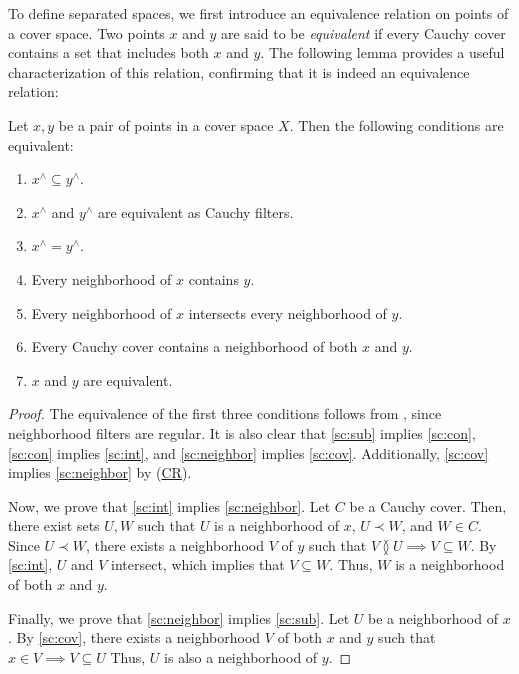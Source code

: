\documentclass[pdflatex,sn-mathphys-num]{sn-jnl}
\newcommand{\axref}[1]{(\hyperref[ax:#1]{#1})}
\theoremstyle{definition}
\theoremstyle{remark}
\numberwithin{figure}{section}
\newcommand{\overlap}[2]{#1 \between #2}
\newcommand{\rb}{\prec}
\begin{document}
To define separated spaces, we first introduce an equivalence relation on points of a cover space.
Two points $x$ and $y$ are said to be \emph{equivalent} if every Cauchy cover contains a set that includes both $x$ and $y$.
The following lemma provides a useful characterization of this relation, confirming that it is indeed an equivalence relation:

\begin{lem}
Let $x,y$ be a pair of points in a cover space $X$.
Then the following conditions are equivalent:
\begin{enumerate}
\item \label{sc:sub} $x^\wedge \subseteq y^\wedge$.
\item $x^\wedge$ and $y^\wedge$ are equivalent as Cauchy filters.
\item $x^\wedge = y^\wedge$.
\item \label{sc:con} Every neighborhood of $x$ contains $y$.
\item \label{sc:int} Every neighborhood of $x$ intersects every neighborhood of $y$.
\item \label{sc:neighbor} Every Cauchy cover contains a neighborhood of both $x$ and $y$.
\item \label{sc:cov} $x$ and $y$ are equivalent.
\end{enumerate}
\end{lem}
\begin{proof}
The equivalence of the first three conditions follows from , since neighborhood filters are regular.
It is also clear that \eqref{sc:sub} implies \eqref{sc:con}, \eqref{sc:con} implies \eqref{sc:int}, and \eqref{sc:neighbor} implies \eqref{sc:cov}.
Additionally, \eqref{sc:cov} implies \eqref{sc:neighbor} by \axref{CR}.

Now, we prove that \eqref{sc:int} implies \eqref{sc:neighbor}.
Let $C$ be a Cauchy cover.
Then, there exist sets $U,W$ such that $U$ is a neighborhood of $x$, $U \rb W$, and $W \in C$.
Since $U \rb W$, there exists a neighborhood $V$ of $y$ such that $\overlap{V}{U} \implies V \subseteq W$.
By \eqref{sc:int}, $U$ and $V$ intersect, which implies that $V \subseteq W$.
Thus, $W$ is a neighborhood of both $x$ and $y$.

Finally, we prove that \eqref{sc:neighbor} implies \eqref{sc:sub}.
Let $U$ be a neighborhood of $x$.
By \eqref{sc:cov}, there exists a neighborhood $V$ of both $x$ and $y$ such that $x \in V \implies V \subseteq U$
Thus, $U$ is also a neighborhood of $y$.
\end{proof}
\end{document}
